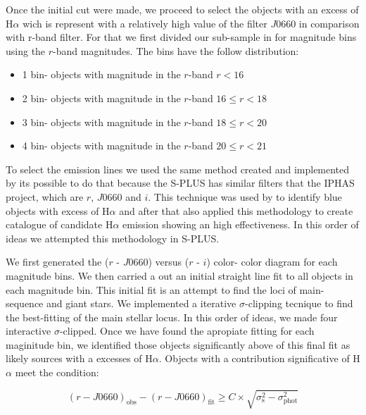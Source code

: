 \documentclass[fleqn,usenatbib]{mnras}
\begin{document}
Once the initial cut were made, we proceed to select the objects with
an excess of H{$\alpha$} wich is represent with a relatively high value of
the filter $J$0660 in comparison with r-band filter. For that we
first divided our sub-sample in for magnitude bins using the $r$-band
magnitudes. The bins have the follow distribution:

\begin{itemize}
\item 1 bin- objects with magnitude in the $r$-band $r < 16$
\item 2 bin- objects with magnitude in the $r$-band $16 \leq r < 18$
\item 3 bin- objects with magnitude in the $r$-band $18 \leq r < 20$
\item 4 bin- objects with magnitude in the $r$-band $20 \leq r < 21$
  
\end{itemize}

To select the emission lines we used the same method created and
implemented by \citet{Witham:2008} its possible to do that because
the S-PLUS has similar filters that the IPHAS project, which are
$r$, $J$0660 and $i$. This technique was used by \citet{Scaringi:2013}
to identify blue objects with excess of H{$\alpha$} and after that
\citet{Wevers:2017} also applied this methodology to create catalogue
of candidate H{$\alpha$} emission showing an high effectiveness. In this
order of ideas we attempted this methodology in S-PLUS.

We first generated the ($r$ - $J$0660) versus ($r$ - $i$) color- color
diagram for each magnitude bins. We then carried a out an initial straight
line fit to all objects in each magnitude bin. This initial fit is an
attempt to find the loci of main-sequence and giant stars. We implemented
a iterative $\sigma$-clipping tecnique to find the best-fitting of the main
stellar locus. In this order of ideas, we made four interactive $\sigma$-clipped.
Once we have found the apropiate fitting for each maginitude bin, we identified
those objects significantly above of this final fit as likely sources with
a excesses of H{$\alpha$}. Objects with a contribution significative of H{$\alpha$}
meet the condition:

\begin{equation}
  (r - J0660)_{\mathrm{obs}} - (r - J0660)_{\mathrm{fit}} \geq C \times \sqrt{\sigma^2_{\mathrm{s}} - \sigma^2_{\mathrm{phot}}}
  \label{eq:criterion}
\end{equation}
 
\end{document}
